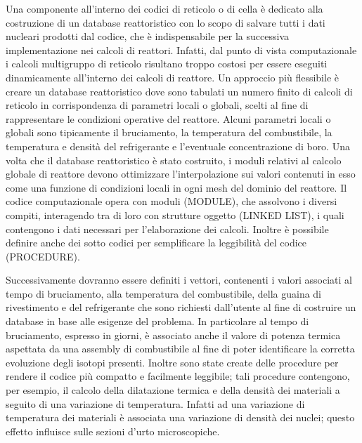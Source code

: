 Una componente all'interno dei codici di reticolo o di cella è dedicato alla 
costruzione di un database reattoristico con lo scopo di salvare tutti i dati 
nucleari prodotti dal codice, che è indispensabile per la successiva 
implementazione nei calcoli di reattori.
Infatti, dal punto di vista computazionale i calcoli multigruppo di reticolo 
risultano troppo costosi per essere eseguiti dinamicamente all'interno dei 
calcoli di reattore.
Un approccio più flessibile è creare un database reattoristico dove sono 
tabulati un numero finito di calcoli di reticolo in corrispondenza di parametri 
locali o globali, scelti al fine di rappresentare le condizioni operative del 
reattore.
Alcuni parametri locali o globali sono tipicamente il bruciamento, la 
temperatura del combustibile, la temperatura e densità del refrigerante e
l'eventuale concentrazione di boro.
Una volta che il database reattoristico è stato costruito, i moduli relativi al 
calcolo globale di reattore devono ottimizzare l'interpolazione sui valori 
contenuti in esso come una funzione di condizioni locali in ogni mesh del 
dominio del reattore.
Il codice computazionale opera con moduli (MODULE), che assolvono i 
diversi compiti, interagendo tra di loro con strutture oggetto (LINKED LIST), i quali contengono i dati necessari per l'elaborazione dei calcoli.
Inoltre è possibile definire anche dei sotto codici per semplificare la 
leggibilità 
del codice (PROCEDURE).

Successivamente dovranno essere definiti i vettori, contenenti i valori 
associati al tempo di bruciamento, alla temperatura del combustibile, della 
guaina di rivestimento e del refrigerante che sono richiesti dall'utente al fine 
di costruire un 
database in base alle esigenze del problema.
In particolare al tempo di bruciamento, espresso in giorni, è associato anche 
il 
valore di potenza termica aspettata da una assembly di combustibile al fine di 
poter identificare la corretta evoluzione degli isotopi presenti.
Inoltre sono state create delle procedure per rendere il codice più compatto e 
facilmente leggibile; tali procedure contengono, per esempio, il calcolo della 
dilatazione termica e della densità dei materiali a seguito di una variazione di 
temperatura. 
Infatti ad una variazione di temperatura dei materiali è associata una variazione 
di densità dei nuclei; questo effetto influisce sulle sezioni d'urto 
microscopiche.

